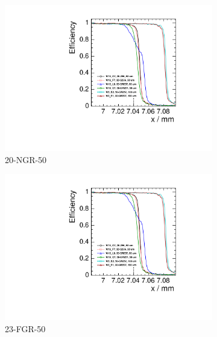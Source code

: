 \begin{figure}[htbp]
  \begin{subfigure}[b]{0.24\textwidth}
    \centering
    \includegraphics[width=\textwidth, page=3]{figures/TestBeam/edge_bcp.pdf}
  \caption{20-NGR-50}\label{fig:EdgeEfficiency_20NGR50}
  \end{subfigure}\hfill
  \begin{subfigure}[b]{0.24\textwidth}
    \centering
    \includegraphics[width=\textwidth, page=6]{figures/TestBeam/edge_bcp.pdf}
  \caption{23-FGR-50}\label{fig:EdgeEfficiency_23FGR50}
  \end{subfigure}\hfill
  \begin{subfigure}[b]{0.24\textwidth}
    \centering

\end{subfigure}
\end{figure}
